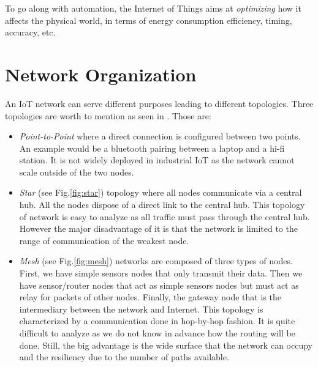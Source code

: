To go along with automation, the Internet of Things aims at \textit{optimizing} how it affects the physical world, in terms of energy consumption efficiency, timing, accuracy, etc.

\section{Network Organization}

An IoT network can serve different purposes leading to different topologies. Three topologies are worth to mention as seen in \cite{website:3topo}. Those are:
\begin{itemize}
  \item \textit{Point-to-Point} where a direct connection is configured between two points. An example would be a bluetooth pairing between a laptop and a hi-fi station. It is not widely deployed in industrial IoT as the network cannot scale outside of the two nodes.
  \item \textit{Star} (see Fig.\ref{fig:star}) topology where all nodes communicate via a central hub. All the nodes dispose of a direct link to the central hub. This topology of network is easy to analyze as all traffic must pass through the central hub. However the major disadvantage of it is that the network is limited to the range of communication of the weakest node.
  \item \textit{Mesh} (see Fig.\ref{fig:mesh}) networks are composed of three types of nodes. First, we have simple sensors nodes that only transmit their data. Then we have sensor/router nodes that act as simple sensors nodes but must act as relay for packets of other nodes. Finally, the gateway node that is the intermediary between the network and Internet. This topology is characterized by a communication done in hop-by-hop fashion. It is quite difficult to analyze as we do not know in advance how the routing will be done. Still, the big advantage is the wide surface that the network can occupy and the resiliency due to the number of paths available.\\
\end{itemize}

